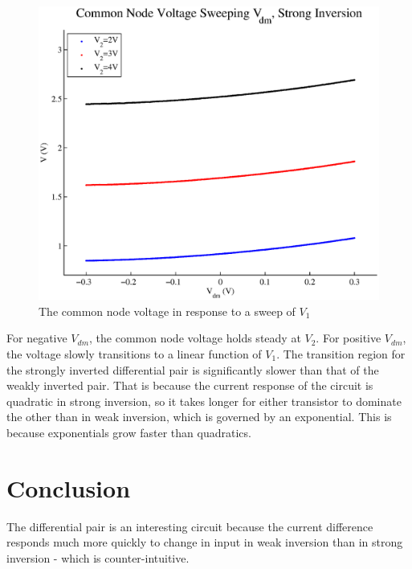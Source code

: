 \documentclass{article}
\begin{document}
\begin{figure}[H]
\centering
\includegraphics[scale=.7]{plot_strong_v.eps}
\caption{The common node voltage in response to a sweep of $V_1$}
\label{strongV}
\end{figure}

For negative $V_{dm}$, the common node voltage holds steady at $V_2$.  For positive $V_{dm}$, the voltage slowly transitions to a linear function of $V_{1}$.  The transition region for the strongly inverted differential pair is significantly slower than that of the weakly inverted pair.  That is because the current response of the circuit is quadratic in strong inversion, so it takes longer for either transistor to dominate the other than in weak inversion, which is governed by an exponential.  This is because exponentials grow faster than quadratics.

\section*{Conclusion}

The differential pair is an interesting circuit because the current difference responds much more quickly to change in input in weak inversion than in strong inversion - which is counter-intuitive.
\end{document}
